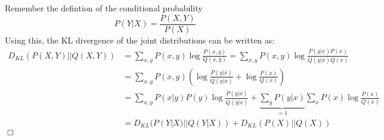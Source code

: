 \begin{answer}
Remember the defintion of the conditional probability
\begin{equation*}
    P(Y|X) = \frac{P(X, Y)}{P(X)}
\end{equation*}
Using this, the KL divergence of the joint distributions can be written as:
\begin{align*}
    D_{KL}(P(X,Y)||Q(X,Y)) &= \sum_{x, y} P(x,y)\log{\frac{P(x,y)}{Q(x,y)}}
   = \sum_{x, y} P(x,y)\log{\frac{P(y|x)P(x)}{Q(y|x)Q(x)}} \\
   &= \sum_{x, y} P(x,y)\left(\log{\frac{P(y|x)}{Q(y|x)}} + \log{\frac{P(x)}{Q(x)}} \right) \\
   &= \sum_{x, y} P(x|y)P(y)\log{\frac{P(y|x)}{Q(y|x)}} + \underbrace{\sum_{y} P(y|x)}_{=1} \sum_x P(x) \log{\frac{P(x)}{Q(x)}} \\
   &= D_{KL}(P(Y|X)||Q(Y|X)) + D_{KL}(P(X)||Q(X))
\end{align*}
\hfill \ensuremath{\Box}
\end{answer}
